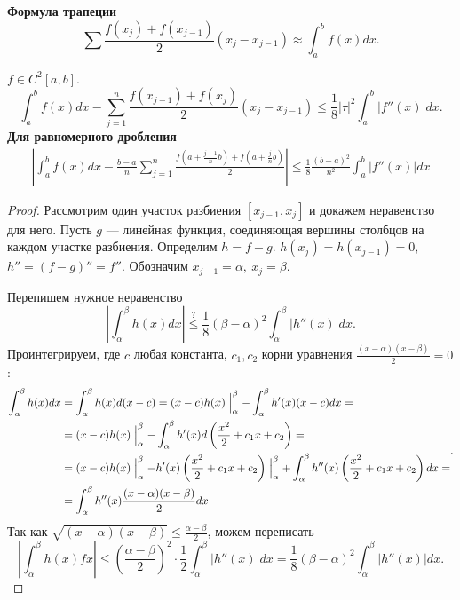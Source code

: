 {\bf Формула трапеции}  
\[
    \sum_{}^{} \frac{f(x_j) + f(x_{j-1})}{2} (x_j- x_{j-1}) \approx \int_{a}^{b} f(x) dx
.\] 
\begin{thm}
    $ f \in  C^2[a, b]$.
    \[
	\int_{a}^{b} f(x) dx - \sum_{j=1}^{n} \frac{f(x_{j - 1}) + f(x_j)}{2} (x_j - x_{j-1}) \le \frac{1}{8}\lvert \tau  \rvert ^2 \int_{a}^{b} \lvert f''(x) \rvert dx  
    .\] 
	{\bf Для равномерного дробления}
	    \[
	    \begin{aligned}
		\left| \int_{a}^{b} f(x) dx - \frac{b-a}{n}\sum_{j=1}^{n} \frac{f\left(a + \frac{j-1}{n}b \right) + f\left( a+ \frac{j}{n}b \right) }{2} \right|  \le \frac{1}{8} \frac{ (b-a)^2}{n^2} \int_{a}^{b} \lvert f''(x) \rvert  dx
	    \end{aligned}
	    \]
\end{thm}
\begin{proof}
    Рассмотрим один участок разбиения $ [x_{j-1}, x_j]$ и докажем неравенство для него. Пусть $ g$ ---  линейная функция, соединяющая вершины столбцов на каждом участке разбиения. Определим $ h = f - g$.  $ h(x_j) = h(x_{j-1})  = 0$, $ h'' = (f-g)'' = f''$. Обозначим  $ x_{j-1} = \alpha , ~ x_j = \beta  $.

    Перепишем нужное неравенство
    \[
	\left| \int_{\alpha }^{\beta } h(x) dx  \right| \stackrel{?}{\le} \frac{1}{8} (\beta - \alpha )^2 \int_{\alpha }^{\beta } \lvert h''(x) \rvert  dx
    .\] 
    Проинтегрируем, где $ c $ любая константа, $ c_1, c_2$ корни уравнения $ \frac{(x-\alpha )(x-\beta )}{2} = 0$:
    \[
    \begin{aligned}
	\int_{\alpha }^{\beta } h(x) dx &= \int_{\alpha }^{\beta } h(x) d(x-c) = (x-c) h(x) \Bigm|_\alpha ^\beta - \int_{\alpha }^{\beta } h'(x)(x-c)dx = \\
					&= (x-c) h(x) \Bigm|_\alpha ^{\beta } - \int_{\alpha }^{\beta } h'(x) d\left( \frac{x^2}{2}+c_1x + c_2 \right) = \\
					&= (x-c) h(x) \Bigm|_\alpha ^{\beta } - h'(x)\left( \frac{x^2}{2} + c_1x+c_2 \right) \Bigm|_{\alpha }^{\beta } + \int_{\alpha }^{\beta } h''(x)\left( \frac{x^2}{2} +c_1 x + c_2 \right) dx = \\
					& = \int_{\alpha }^{\beta } h''(x) \frac{(x-\alpha )(x-\beta )}{2}dx 
    \end{aligned}
    .\]
    Так как  $ \sqrt{(x-\alpha)(x-\beta )} \le \frac{\alpha -\beta }{2} $, можем переписать
    \[
	\left| \int_{\alpha }^{\beta } h(x) fx  \right| \le \left( \frac{\alpha -\beta }{2} \right) ^2 \cdot \frac{1}{2} \int_{\alpha }^{\beta } \left| h''(x) \right| dx = \frac{1}{8}(\beta -\alpha )^2 \int_{\alpha }^{\beta } \left| h''(x) \right| dx  
    .\] 
\end{proof}

